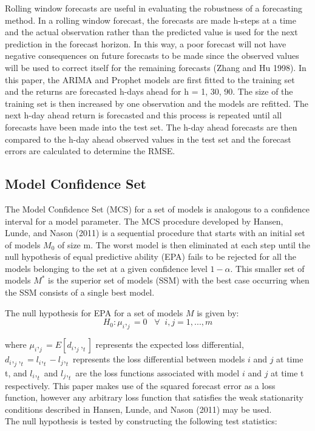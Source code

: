 \documentclass[12pt,a4paper]{article}
\numberwithin{equation}{section}
\numberwithin{figure}{section}
\numberwithin{table}{section}
\begin{document}
Rolling window forecasts are useful in evaluating the robustness of a
forecasting method. In a rolling window forecast, the forecasts are made
h-steps at a time and the actual observation rather than the predicted
value is used for the next prediction in the forecast horizon. In this
way, a poor forecast will not have negative consequences on future
forecasts to be made since the observed values will be used to correct
itself for the remaining forecasts (Zhang and Hu 1998). In this paper,
the ARIMA and Prophet models are first fitted to the training set and
the returns are forecasted h-days ahead for h = 1, 30, 90. The size of
the training set is then increased by one observation and the models are
refitted. The next h-day ahead return is forecasted and this process is
repeated until all forecasts have been made into the test set. The h-day
ahead forecasts are then compared to the h-day ahead observed values in
the test set and the forecast errors are calculated to determine the
RMSE.

\subsection{Model Confidence Set}\label{model-confidence-set}

The Model Confidence Set (MCS) for a set of models is analogous to a
confidence interval for a model parameter. The MCS procedure developed
by Hansen, Lunde, and Nason (2011) is a sequential procedure that starts
with an initial set of models \(M_0\) of size m. The worst model is then
eliminated at each step until the null hypothesis of equal predictive
ability (EPA) fails to be rejected for all the models belonging to the
set at a given confidence level \(1 - \alpha\). This smaller set of
models \(M^*\) is the superior set of models (SSM) with the best case
occurring when the SSM consists of a single best model.

The null hypothesis for EPA for a set of models \(M\) is given by:
\[H_0: \mu_i,_j = 0 \;\;\; \forall \;\; i,j = 1,...,m\]

where \(\mu_i,_j = E[d_i,_j,_t]\) represents the expected loss
differential, \(d_i,_j,_t = l_i,_t - l_j,_t\) represents the loss
differential between models \(i\) and \(j\) at time t, and \(l_i,_t\)
and \(l_j,_t\) are the loss functions associated with model \(i\) and
\(j\) at time t respectively. This paper makes use of the squared
forecast error as a loss function, however any arbitrary loss function
that satisfies the weak stationarity conditions described in Hansen,
Lunde, and Nason (2011) may be used.\\
The null hypothesis is tested by constructing the following test
statistics:
\end{document}
